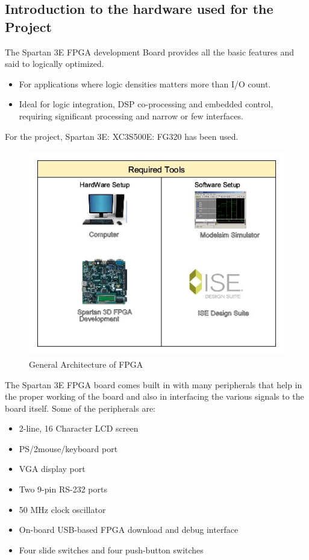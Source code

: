 \documentclass[12pt,a4paper]{article}
\begin{document}
\subsection{Introduction to the hardware used for the Project}
The Spartan 3E FPGA development Board provides all the basic features and said to logically optimized.
\begin{itemize}

\item For applications where logic densities matters more than I/O count.\
\item Ideal for logic integration, DSP co-processing and embedded control, requiring significant processing and narrow or few interfaces.
\end{itemize}

For the project, Spartan 3E: XC3S500E: FG320 has been used.\ 

\begin{figure}[H]
\centering
\includegraphics[width=11.5cm,height=9cm]{Required.jpg}
\caption{General Architecture of FPGA}
\label{Required.jpg}
\end{figure}

The Spartan 3E FPGA board comes built in with many peripherals that help in the proper working of the board and also in interfacing the various signals to the board itself. Some of the peripherals are:\

\begin{itemize}
\item 2-line, 16 Character LCD screen \
\item PS/2mouse/keyboard port \
\item VGA display port\
\item Two 9-pin RS-232 ports\
\item 50 MHz clock oscillator\
\item On-board USB-based FPGA download and debug interface\
\item Four slide switches and four push-button switches\

\end{itemize}
\end{document}
